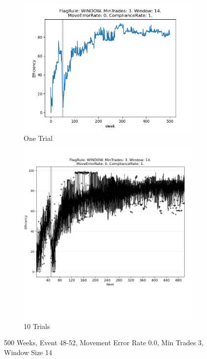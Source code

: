 \documentclass{article}%
\begin{document}
\begin{figure}[!htb]%
\begin{subfigure}[b]{0.45\linewidth}%
\includegraphics[width=\linewidth]{1056fr_WINDOW_mt_3_ws_14_er_0_cr_1_t1.png}%
\caption{One Trial}%
\end{subfigure}%
\begin{subfigure}[b]{0.45\linewidth}%
\includegraphics[clip,width=\linewidth,trim=0 4cm 0 0]{1056fr_WINDOW_mt_3_ws_14_er_0_cr_1_t10.png}%
\caption{10 Trials}%
\end{subfigure}%
\caption{500 Weeks, Event 48{-}52, Movement Error Rate 0.0, Min Trades 3, Window Size 14}%
\end{figure}
\end{document}
